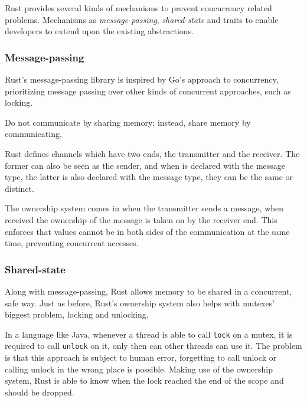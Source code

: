 Rust provides several kinds of mechanisms to prevent concurrency related problems.
Mechanisms as \emph{message-passing}, \emph{shared-state} and
traits to enable developers to extend upon the existing abstractions.

\subsubsection*{Message-passing}

Rust's message-passing library is inspired by Go's approach to concurrency,
prioritizing message passing over other kinds of concurrent approaches, such as locking.

\begin{displayquote}
    Do not communicate by sharing memory; instead, share memory by communicating.
\end{displayquote}

Rust defines channels which have two ends, the transmitter and the receiver.
The former can also be seen as the sender, and when is declared with the message type,
the latter is also declared with the message type, they can be the same or distinct.

The ownership system comes in when the transmitter sends a message,
when received the ownership of the message is taken on by the receiver end.
This enforces that values cannot be in both sides of the communication at the same time,
preventing concurrent accesses.

\subsubsection*{Shared-state}

Along with message-passing, Rust allows memory to be shared in a concurrent, safe way.
Just as before, Rust's ownership system also helps with mutexes' biggest problem, locking and unlocking.

In a language like Java, whenever a thread is able to call \texttt{lock} on a mutex,
it is required to call \texttt{unlock} on it, only then can other threads can use it.
The problem is that this approach is subject to human error,
forgetting to call unlock or calling unlock in the wrong place is possible.
Making use of the ownership system, Rust is able to know when the lock reached the end of the scope and should be dropped.

